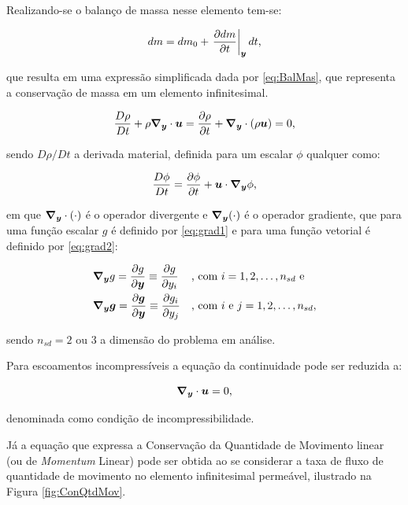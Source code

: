 Realizando-se o balanço de massa nesse elemento tem-se:

\begin{equation}
    dm=dm_0+\left.\frac{\partial{dm}}{\partial{t}}\right|_{\boldsymbol{y}}dt\text{,}
\end{equation}

\noindent que resulta em uma expressão simplificada dada por \eqref{eq:BalMas}, que representa a conservação de massa em um elemento infinitesimal.

\begin{equation}
    \frac{D\rho}{Dt}+\rho \boldsymbol{\nabla_y}\cdot\boldsymbol{u}=\frac{\partial{\rho}}{\partial t}+\boldsymbol{\nabla_y}\cdot(\rho \boldsymbol{u})=0\text{,}
    \label{eq:BalMas}
\end{equation}

\noindent sendo $D\rho/Dt$ a derivada material, definida para um escalar $\phi$ qualquer como:

\begin{equation}
    \frac{D\phi}{Dt}=\frac{\partial{\phi}}{\partial t}+\boldsymbol{u}\cdot\boldsymbol{\nabla_y}\phi\text{,}
\end{equation}

\noindent em que $\boldsymbol{\nabla_y}\cdot(\cdot)$ é o operador divergente e $\boldsymbol{\nabla_y}(\cdot)$ é o operador gradiente, que para uma função escalar $g$ é definido por \eqref{eq:grad1} e para uma função vetorial é definido por \eqref{eq:grad2}:

\begin{subequations}
    \begin{align}
         & \boldsymbol{\nabla_y} g=\frac{\partial{g}}{\partial{\boldsymbol{y}}}\equiv\frac{\partial{g}}{\partial{y_i}}            &  & \text{, com }i=1,2,\hdots,n_{sd}\text{ e} \label{eq:grad1}    \\
         & \boldsymbol{\nabla_y}\boldsymbol{g}=\frac{\partial{\boldsymbol{g}}}{\partial{\boldsymbol{y}}}\equiv\frac{\partial{g_i}}{\partial{y_j}} &  & \text{, com }i\text{ e }j=1,2,\hdots,n_{sd}, \label{eq:grad2}
    \end{align}
\end{subequations}

\noindent sendo $n_{sd}=2$ ou $3$ a dimensão do problema em análise.

Para escoamentos incompressíveis a equação da continuidade pode ser reduzida a:

\begin{equation}
    \boldsymbol{\nabla_y}\cdot\boldsymbol{u}=0\text{,}\label{eq:incomp}
\end{equation}

\noindent denominada como condição de incompressibilidade.

Já a equação que expressa a Conservação da Quantidade de Movimento linear (ou de \textit{Momentum} Linear) pode ser obtida ao se considerar a taxa de fluxo de quantidade de movimento no elemento infinitesimal permeável, ilustrado na Figura \ref{fig:ConQtdMov}.

